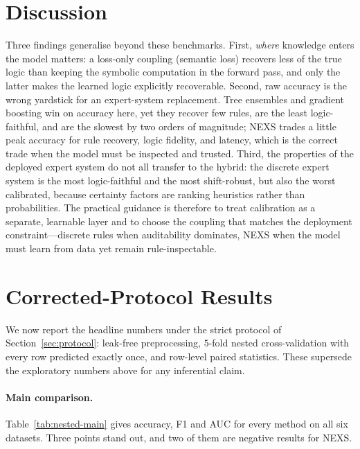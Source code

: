 \documentclass[11pt]{article}
\newcommand{\nexs}{\textsc{NEXS}}
\begin{document}
\section{Discussion}
\label{sec:discussion}
Three findings generalise beyond these benchmarks. First, \emph{where} knowledge
enters the model matters: a loss-only coupling (semantic loss) recovers less of
the true logic than keeping the symbolic computation in the forward pass, and only
the latter makes the learned logic explicitly recoverable. Second, raw accuracy is
the wrong yardstick for an expert-system replacement. Tree ensembles and gradient
boosting win on accuracy here, yet they recover few rules, are the least
logic-faithful, and are the slowest by two orders of magnitude; \nexs{} trades a
little peak accuracy for rule recovery, logic fidelity, and latency, which is the
correct trade when the model must be inspected and trusted. Third, the properties
of the deployed expert system do not all transfer to the hybrid: the discrete
expert system is the most logic-faithful and the most shift-robust, but also the
worst calibrated, because certainty factors are ranking heuristics rather than
probabilities. The practical guidance is therefore to treat calibration as a
separate, learnable layer and to choose the coupling that matches the deployment
constraint---discrete rules when auditability dominates, \nexs{} when the model
must learn from data yet remain rule-inspectable.

\section{Corrected-Protocol Results}
\label{sec:corrected}
We now report the headline numbers under the strict protocol of
Section~\ref{sec:protocol}: leak-free preprocessing, $5$-fold nested
cross-validation with every row predicted exactly once, and row-level paired
statistics. These supersede the exploratory numbers above for any inferential
claim.

\paragraph{Main comparison.}
Table~\ref{tab:nested-main} gives accuracy, F1 and AUC for every method on all six
datasets. Three points stand out, and two of them are negative results for \nexs{}.
\end{document}
